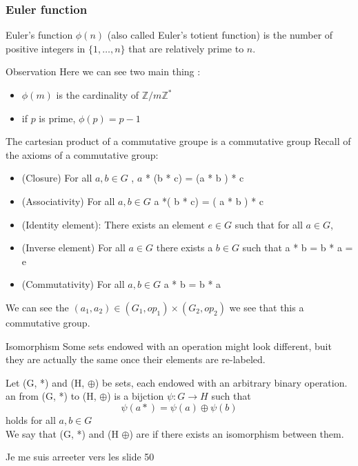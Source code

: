 \subsubsection{Euler function}
\begin{definition}
    Euler's function $\phi\left(n\right)$ (also called Euler's totient function) is  the number of positive integers in $\{1, \dots, n\}$ that are relatively prime to $n$.
\end{definition}

\begin{parag}{Observation}
    Here we can see two main thing :
    \begin{itemize}
        \item $\phi\left(m\right)$ is the cardinality of $ \mathbb{Z}/ m \mathbb{Z}^*$
        \item if $p$ is prime, $\phi\left(p\right) = p-1$
        
    \end{itemize}
    
    
\end{parag}
\begin{parag}{The cartesian product of a commutative groupe is a commutative group}
    Recall of the axioms of a commutative group:
 \begin{itemize}
    \item (Closure) For all $a, b \in G$ , $a$ * (b * c) = (a * b ) * c
    \item (Associativity) For all $a, b \in G$ a *( b * c) = ( a * b ) * c
    \item (Identity element): There exists an element $e \in G$ such that for all $a \in G$, 
    \item (Inverse element) For all $a \in G$ there exists a $b \in G$ such that a * b = b * a = e
    \item (Commutativity) For all  $a, b \in G$ a * b = b * a
\end{itemize}

We can see the $\left(a_1, a_2\right) \in \left(G_1, op_1\right) \times \left(G_2, op_2\right)$ we see that this  a commutative group.
\end{parag}
\begin{parag}{Isomorphism}
    Some sets endowed with an operation might look different, buit they are actually the same once their elements are re-labeled.
    \begin{definition}
    Let (G, *) and (H, $\oplus$) be sets, each endowed with an arbitrary binary operation.\\
    an  from (G, *) to (H, $\oplus$) is a bijction $\psi: G \to H$ such that
    \begin{equation*} \psi\left(a  *\right) = \psi\left(a\right) \oplus \psi\left(b\right) \end{equation*}
    holds for all $a, b \in G$\\
    We say that (G, *) and (H $\oplus$) are  if there exists an isomorphism between them.
    \end{definition}
    Je me suis arreeter vers les slide 50
\end{parag}



